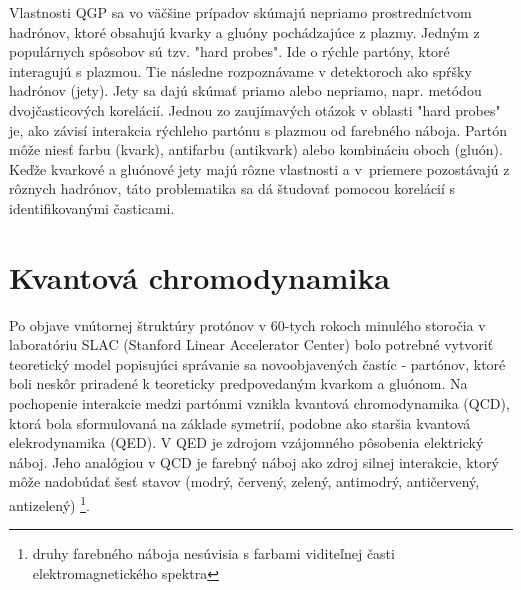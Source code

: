 \documentclass[thesismargins, thesislinespacing]{rnthesis}
\begin{document}
Vlastnosti QGP sa vo väčšine prípadov skúmajú nepriamo prostredníctvom \-had\-ró\-nov, ktoré obsahujú kvarky a gluóny pochádzajúce z plazmy. Jedným z populárnych \-spô\-so\-bov sú tzv. "hard probes". Ide o rýchle partóny, ktoré interagujú s plazmou. Tie následne rozpoznávame v detektoroch ako spŕšky hadrónov (jety). Jety sa dajú skúmať \-pria\-mo alebo nepriamo, napr. metódou dvojčasticových korelácií. Jednou zo zaujímavých otázok v oblasti "hard probes" \-je, ako závisí interakcia rýchleho partónu s plazmou od farebného náboja. Partón môže niesť farbu (kvark), antifarbu (antikvark) alebo kombináciu oboch (gluón). Keďže kvarkové a gluónové jety majú rôzne vlastnosti a v~priemere pozostávajú z rôznych hadrónov, táto problematika sa dá študovať pomocou korelácií s identifikovanými časticami.  

\chapter{Kvantová chromodynamika}

Po objave vnútornej štruktúry protónov v 60-tych rokoch minulého storočia v laboratóriu SLAC (Stanford Linear Accelerator Center) bolo potrebné vytvoriť teoretický model popisujúci správanie sa novoobjavených častíc - partónov, ktoré boli neskôr priradené k teoreticky predpovedaným kvarkom a gluónom. Na pochopenie interakcie medzi partónmi vznikla kvantová chromodynamika (QCD), ktorá bola sformulovaná na základe symetrií, podobne ako staršia kvantová elekrodynamika (QED). V QED je zdrojom vzájomného pôsobenia elektrický náboj. Jeho analógiou v QCD je farebný náboj ako zdroj silnej interakcie, ktorý môže nadobúdať šesť stavov (modrý, červený, zelený, antimodrý, antičervený, antizelený) \footnote{druhy farebného náboja nesúvisia s farbami viditeľnej časti elektromagnetického spektra}.
\end{document}
